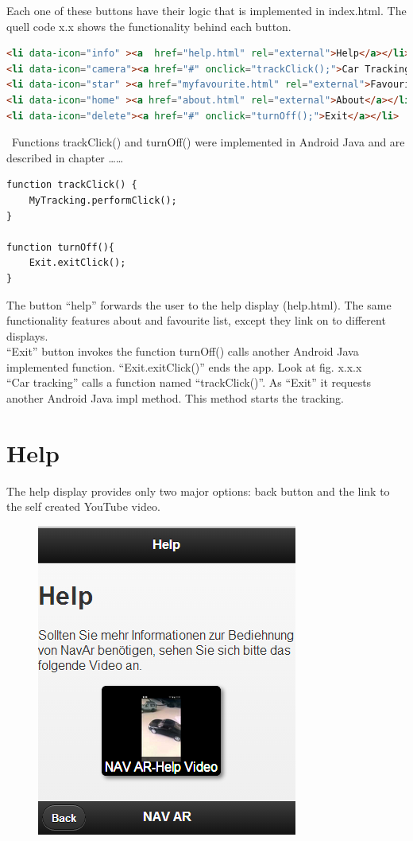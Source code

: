 Each one of these buttons have their logic that is implemented in index.html. The quell code x.x  shows the functionality behind each button.
\\

\begin{lstlisting}[language=html, caption= 
start menu source code,captionpos=b]
<li data-icon="info" ><a  href="help.html" rel="external">Help</a></li>
<li data-icon="camera"><a href="#" onclick="trackClick();">Car Tracking</a></li>
<li data-icon="star" ><a href="myfavourite.html" rel="external">Favourite List</a></li>
<li data-icon="home" ><a href="about.html" rel="external">About</a></li>
<li data-icon="delete"><a href="#" onclick="turnOff();">Exit</a></li>
\end{lstlisting}

\
Functions trackClick() and turnOff() were implemented in Android Java and are described in chapter ……
\
\
\begin{lstlisting}[language=html, caption= 
JS start menu methods,captionpos=b]
function trackClick() {
    MyTracking.performClick();
}

function turnOff(){
	Exit.exitClick();
}
\end{lstlisting}

The button “help” forwards the user  to the help display (help.html). The same functionality features about and favourite list, except they link on to different displays. 
\\

“Exit” button invokes the function turnOff() calls another Android Java implemented function. “Exit.exitClick()” ends the app. Look at fig. x.x.x
\\

“Car tracking” calls a function named “trackClick()”. As “Exit” it requests another Android Java impl method. This method starts the tracking.
\\

\section{Help}

The help display provides only two major options: back button and the link to the self created YouTube video. 


\begin{figure}[b]
\centering
\includegraphics[width=0.5\linewidth]{graphics/chapter4/2}
\caption{}
\label{fig:2}
\end{figure}
\newpage


